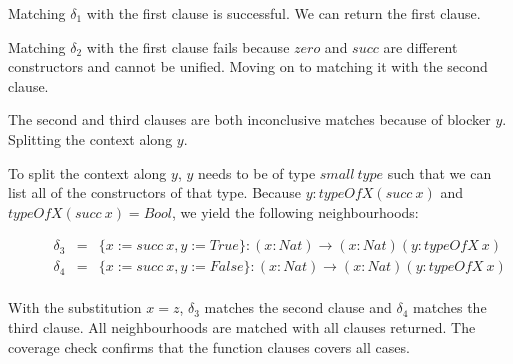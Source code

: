 Matching $\delta_1$ with the first clause is successful. We can return the first clause. 

Matching $\delta_2$ with the first clause fails because $zero$ and $succ$ are different constructors and cannot be unified. Moving on to matching it with the second clause.

The second and third clauses are both inconclusive matches because of blocker $y$. Splitting the context along $y$.

To split the context along $y$, $y$ needs to be of type $small \ type$ such that we can list all of the constructors of that type. Because $y : typeOfX (succ \ x)$ and $typeOfX (succ \ x) = Bool$, we yield the following neighbourhoods:

\begin{figure}[H]
  \begin{equation*}
    \begin{aligned}
      \delta_3 & = & \{x := succ \ x, y := True\} : (x : Nat) \to (x : Nat)(y : typeOfX \ x) \\
      \delta_4 & = & \{x := succ \ x, y := False\} : (x: Nat) \to (x : Nat)(y : typeOfX \ x) \\
    \end{aligned}
  \end{equation*}
\end{figure}

With the substitution $x = z$, $\delta_3$ matches the second clause and $\delta_4$ matches the third clause. All neighbourhoods are matched with all clauses returned. The coverage check confirms that the function clauses covers all cases.

